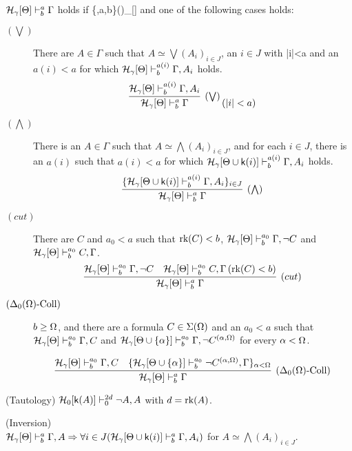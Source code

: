 \documentclass{article}
\begin{document}
\bdf\label{df:controlderreg}
{\rm
${\cal H}_{\gamma}[\Theta]\vdash^{a}_{b}\Gamma$ holds if
\beqn
\label{eq:controlderKP}
\{\gam,a,b\}\cup\sfk(\Gam)\subset\calh_{\gam}[\Tht]
\eeqn
and one of the following
cases holds:


\begin{description}
\item[$(\bigvee)$]
There are $A\in\Gamma$ such that
$A\simeq\bigvee(A_{i})_{i\in J}$, an $i\in J$  with
\beqn
\label{eq:controlder1KP}
|i|<a
\eeqn
and an $a(i)<a$ for which
${\cal H}_{\gamma}[\Theta]\vdash^{a(i)}_{b}\Gamma,A_{i}$ holds.
\[
\infer[(\bigvee)]{\calh_{\gam}[\Tht]\vdash^{a}_{b}\Gamma}
{
\calh_{\gam}[\Tht]\vdash^{a(i)}_{b}\Gamma,A_{i}
}
\,
(|i|<a)
\]

 
\item[$(\bigwedge)$]
There is an $A\in\Gamma$ such that
$A\simeq\bigwedge(A_{i})_{i\in J}$, and for each $i\in J$, 
there is an $a(i)$ such that $a(i)<a$ for which
${\cal H}_{\gamma}[\Theta\cup{\sf k}(i)]\vdash^{a(i)}_{b}\Gamma,A_{i}$ holds.
\[
\infer[(\bigwedge)]{\calh_{\gam}[\Tht]\vdash^{a}_{b}\Gamma}
{
\{
\calh_{\gam}[\Tht\cup\sfk(i)]\vdash^{a(i)}_{b}\Gamma,A_{i}
\}_{i\in J}
}
\]



\item[$(cut)$]
There are $C$ and $a_{0}<a$ such that
$\mbox{{\rm rk}}(C)<b$, ${\cal H}_{\gamma}[\Theta]\vdash^{a_{0}}_{b}\Gamma,\lnot C$ 
and
 ${\cal H}_{\gamma}[\Theta]\vdash^{a_{0}}_{b}C,\Gamma$.
\[
\infer[(cut)]{\calh_{\gam}[\Tht]\vdash^{a}_{b}\Gamma}
{
\calh_{\gam}[\Tht]\vdash^{a_{0}}_{b}\Gamma,\lnot C
&
\calh_{\gam}[\Tht]\vdash^{a_{0}}_{b}C, \Gamma
\,(\rk(C)<b)
}
\]


\item[$(\Delta_{0}(\Omega)\mbox{{\rm -Coll}})$]
$b\geq\Omega$, and there are a formula
$C\in\Sigma(\Omega)$ and an
$a_{0}<a$ such that
${\cal H}_{\gamma}[\Theta]\vdash^{a_{0}}_{b}\Gamma, C$
and
${\cal H}_{\gamma}[\Theta\cup\{\alpha\}]\vdash^{a_{0}}_{b}\Gamma, \lnot C^{(\alpha,\Omega)}$
for every $\alpha<\Omega$.



\[
\infer[(\Del_{0}(\Ome)\mbox{{\rm -Coll}})]{\calh_{\gam}[\Tht]\vdash^{a}_{b}\Gamma}
{
\calh_{\gam}[\Tht]\vdash^{a_{0}}_{b}\Gamma, C
&
\{
\calh_{\gam}[\Tht\cup\{\alp\}]\vdash^{a_{0}}_{b} \lnot C^{(\alp,\Ome)}, \Gam
\}_{\alp<\Ome}
}
\]
\end{description}
}
\edf

\blem\label{lem:tautKP}{\rm (Tautology)}
$
{\cal H}_{0}[{\sf k}(A)]\vdash_{0}^{2d}\lnot A,A
$
 with $d=\mbox{{\rm rk}}(A)$.
\elem

\blem\label{lem:3.9.7KP} {\rm (Inversion)}\\
${\cal H}_{\gamma}[\Theta]\vdash^{a}_{b}\Gamma,A \Rightarrow \forall i\in J({\cal H}_{\gamma}[\Theta\cup{\sf k}(i)]\vdash^{a}_{b}\Gamma,A_{i})$
for $A\simeq\bigwedge(A_{i})_{i\in J}$.
\elem
\end{document}

